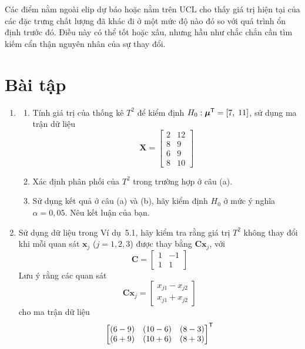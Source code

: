Các điểm nằm ngoài elip dự báo hoặc nằm trên $\mathrm{UCL}$ cho thấy giá trị hiện tại của các đặc trưng chất lượng đã khác đi ở một mức độ nào đó so với quá trình ổn định trước đó. Điều này có thể tốt hoặc xấu, nhưng hầu như chắc chắn cần tìm kiếm cẩn thận nguyên nhân của sự thay đổi.


\section*{Bài tập}

\begin{enumerate}[label=\textbf{5.\arabic*.}, leftmargin=2.8em]
    \item
    \begin{enumerate}[label=(\alph*)]
        \item Tính giá trị của thống kê $T^2$ để kiểm định $H_0: \boldsymbol{\mu}^{\mathsf T} = [7,\; 11]$, sử dụng ma trận dữ liệu
        \[
            \mathbf{X} =
            \begin{bmatrix}
                2 & 12 \\
                8 & 9 \\
                6 & 9 \\
                8 & 10
            \end{bmatrix}
        \]
        \item Xác định phân phối của $T^2$ trong trường hợp ở câu (a).
        \item Sử dụng kết quả ở câu (a) và (b), hãy kiểm định $H_0$ ở mức ý nghĩa $\alpha = 0{,}05$. Nêu kết luận của bạn.
    \end{enumerate}

    \item Sử dụng dữ liệu trong Ví dụ~5.1, hãy kiểm tra rằng giá trị $T^2$ không thay đổi khi mỗi quan sát $\mathbf{x}_j$ ($j = 1, 2, 3$) được thay bằng $\mathbf{C}\mathbf{x}_j$, với
    \[
        \mathbf{C} =
        \begin{bmatrix}
            1 & -1 \\
            1 & 1
        \end{bmatrix}
    \]
    Lưu ý rằng các quan sát
    \[
        \mathbf{C}\mathbf{x}_j =
        \begin{bmatrix}
            x_{j1} - x_{j2} \\
            x_{j1} + x_{j2}
        \end{bmatrix}
    \]
    cho ma trận dữ liệu
    \[
        \begin{bmatrix}
            (6 - 9) & (10 - 6) & (8 - 3) \\
            (6 + 9) & (10 + 6) & (8 + 3)
        \end{bmatrix}^{\mathsf T}
    \]


\end{enumerate}
